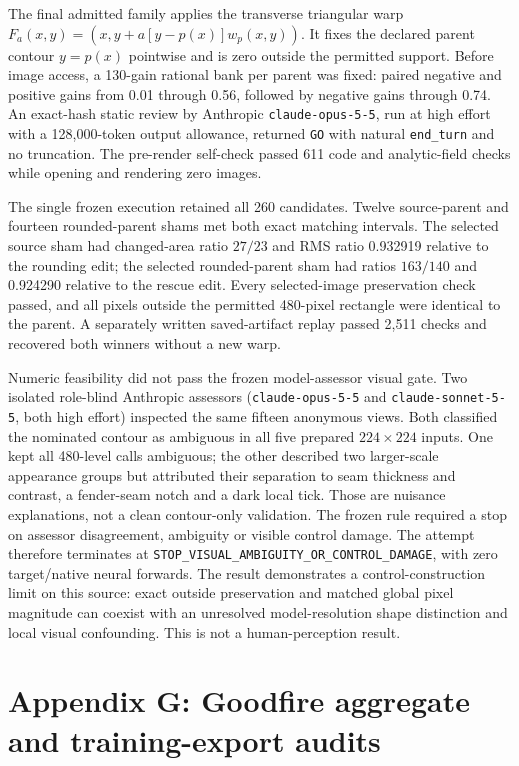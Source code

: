 \documentclass[
  british,
  11pt,
  a4paper,
]{article}
\begin{document}
The final admitted family applies the transverse triangular warp
\(F_a(x,y)=(x,y+a[y-p(x)]w_p(x,y))\). It fixes the declared parent
contour \(y=p(x)\) pointwise and is zero outside the permitted support.
Before image access, a 130-gain rational bank per parent was fixed:
paired negative and positive gains from 0.01 through 0.56, followed by
negative gains through 0.74. An exact-hash static review by Anthropic
\texttt{claude-opus-5-5}, run at high effort with a 128,000-token output
allowance, returned \texttt{GO} with natural \texttt{end\_turn} and no
truncation. The pre-render self-check passed 611 code and analytic-field
checks while opening and rendering zero images.

The single frozen execution retained all 260 candidates. Twelve
source-parent and fourteen rounded-parent shams met both exact matching
intervals. The selected source sham had changed-area ratio \(27/23\) and
RMS ratio 0.932919 relative to the rounding edit; the selected
rounded-parent sham had ratios \(163/140\) and 0.924290 relative to the
rescue edit. Every selected-image preservation check passed, and all
pixels outside the permitted 480-pixel rectangle were identical to the
parent. A separately written saved-artifact replay passed 2,511 checks
and recovered both winners without a new warp.

Numeric feasibility did not pass the frozen model-assessor visual gate.
Two isolated role-blind Anthropic assessors (\texttt{claude-opus-5-5}
and \texttt{claude-sonnet-5-5}, both high effort) inspected the same
fifteen anonymous views. Both classified the nominated contour as
ambiguous in all five prepared \(224\times224\) inputs. One kept all
480-level calls ambiguous; the other described two larger-scale
appearance groups but attributed their separation to seam thickness and
contrast, a fender-seam notch and a dark local tick. Those are nuisance
explanations, not a clean contour-only validation. The frozen rule
required a stop on assessor disagreement, ambiguity or visible control
damage. The attempt therefore terminates at
\texttt{STOP\_VISUAL\_AMBIGUITY\_OR\_CONTROL\_DAMAGE}, with zero
target/native neural forwards. The result demonstrates a
control-construction limit on this source: exact outside preservation
and matched global pixel magnitude can coexist with an unresolved
model-resolution shape distinction and local visual confounding. This is
not a human-perception result.

\section{Appendix G: Goodfire aggregate and training-export
audits}\label{appendix-g-goodfire-aggregate-and-training-export-audits}
\end{document}
